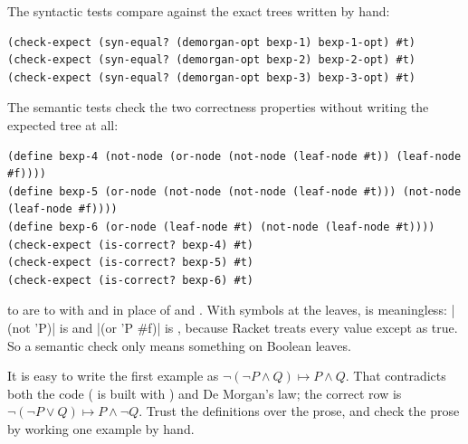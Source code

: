The syntactic tests compare against the exact trees written by hand:
\begin{lstlisting}
(check-expect (syn-equal? (demorgan-opt bexp-1) bexp-1-opt) #t)
(check-expect (syn-equal? (demorgan-opt bexp-2) bexp-2-opt) #t)
(check-expect (syn-equal? (demorgan-opt bexp-3) bexp-3-opt) #t)
\end{lstlisting}
The semantic tests check the two correctness properties without writing the expected tree at all:
\begin{lstlisting}
(define bexp-4 (not-node (or-node (not-node (leaf-node #t)) (leaf-node #f))))
(define bexp-5 (or-node (not-node (not-node (leaf-node #t))) (not-node (leaf-node #f))))
(define bexp-6 (or-node (leaf-node #t) (not-node (leaf-node #t))))
(check-expect (is-correct? bexp-4) #t)
(check-expect (is-correct? bexp-5) #t)
(check-expect (is-correct? bexp-6) #t)
\end{lstlisting}

\begin{remark}
 to  are  to  with  and  in place of  and . With symbols at the leaves,  is meaningless: \rkt|(not 'P)| is  and \rkt|(or 'P #f)| is , because Racket treats every value except  as true. So a semantic check only means something on Boolean leaves.
\end{remark}

\begin{remark}
It is easy to write the first example as $\neg(\neg P \land Q) \mapsto P \land Q$. That contradicts both the code ( is built with ) and De Morgan's law; the correct row is $\neg(\neg P \lor Q) \mapsto P \land \neg Q$. Trust the definitions over the prose, and check the prose by working one example by hand.
\end{remark}
